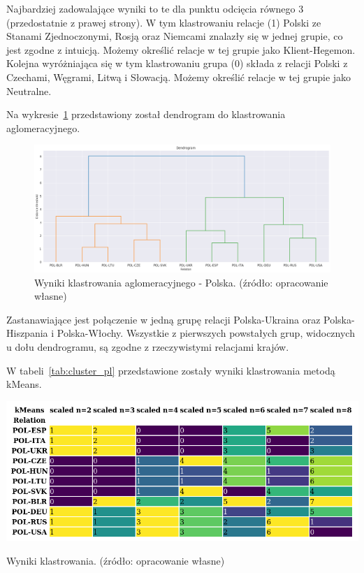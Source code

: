 \documentclass[11pt]{report}
\begin{document}
    Najbardziej zadowalające wyniki to te dla punktu odcięcia równego 3 (przedostatnie z prawej strony).
    W tym klastrowaniu relacje (1) Polski ze Stanami Zjednoczonymi, Rosją oraz Niemcami znalazły się w jednej grupie,
    co jest zgodne z intuicją.
    Możemy określić relacje w tej grupie jako Klient-Hegemon.
    Kolejna wyróżniająca się w tym klastrowaniu grupa (0) składa z relacji Polski z Czechami, Węgrami, Litwą i Słowacją.
    Możemy określić relacje w tej grupie jako Neutralne.

    Na wykresie~\ref{fig:cluster_pl_agg_dendrogram} przedstawiony został dendrogram do klastrowania aglomeracyjnego.
    \begin{figure}[!htp]
        \centering
        \includegraphics[width=\linewidth]{../Power-Client pre analysis/cluster_pl_agg_dendrogram.png}
        \caption{Wyniki klastrowania aglomeracyjnego - Polska. (źródło: opracowanie własne)}
        \label{fig:cluster_pl_agg_dendrogram}
    \end{figure}
    Zastanawiające jest połączenie w jedną grupę relacji Polska-Ukraina oraz Polska-Hiszpania i Polska-Włochy.
    Wszystkie z pierwszych powstałych grup, widocznych u dołu dendrogramu, są zgodne z rzeczywistymi relacjami krajów.

    W tabeli~\ref{tab:cluster_pl} przedstawione zostały wyniki klastrowania metodą kMeans.
    \begin{table}[!htp]
        \centering
        \includegraphics[width=\linewidth]{../Power-Client pre analysis/cluster_pl.png}
        \caption{Wyniki klastrowania. (źródło: opracowanie własne)}
        \label{tab:cluster_pl}
    \end{table}
\end{document}
